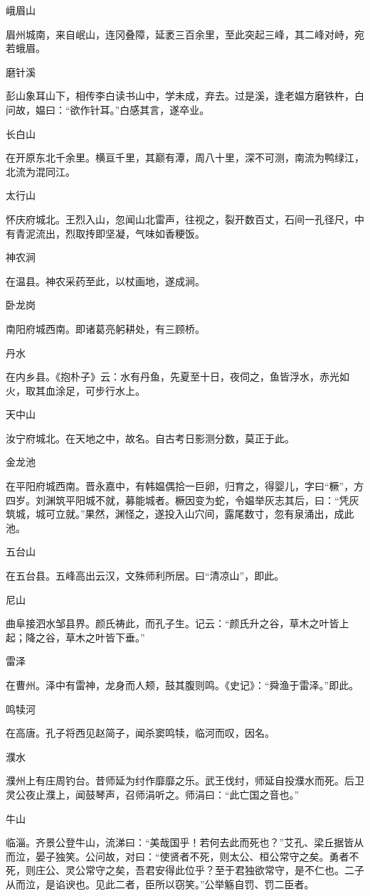 \documentclass[a4paper,12pt,UTF8,twoside]{ctexbook}
\begin{document}
峨眉山

眉州城南，来自岷山，连冈叠障，延袤三百余里，至此突起三峰，其二峰对峙，宛若蛾眉。

磨针溪

彭山象耳山下，相传李白读书山中，学未成，弃去。过是溪，逢老媪方磨铁杵，白问故，媪曰：“欲作针耳。”白感其言，遂卒业。

长白山

在开原东北千余里。横亘千里，其巅有潭，周八十里，深不可测，南流为鸭绿江，北流为混同江。

太行山

怀庆府城北。王烈入山，忽闻山北雷声，往视之，裂开数百丈，石间一孔径尺，中有青泥流出，烈取抟即坚凝，气味如香粳饭。

神农涧

在温县。神农采药至此，以杖画地，遂成涧。

卧龙岗

南阳府城西南。即诸葛亮躬耕处，有三顾桥。

丹水

在内乡县。《抱朴子》云：水有丹鱼，先夏至十日，夜伺之，鱼皆浮水，赤光如火，取其血涂足，可步行水上。

天中山

汝宁府城北。在天地之中，故名。自古考日影测分数，莫正于此。

金龙池

在平阳府城西南。晋永嘉中，有韩媪偶拾一巨卵，归育之，得婴儿，字曰“橛”，方四岁。刘渊筑平阳城不就，募能城者。橛因变为蛇，令媪举灰志其后，曰：“凭灰筑城，城可立就。”果然，渊怪之，遂投入山穴间，露尾数寸，忽有泉涌出，成此池。

五台山

在五台县。五峰高出云汉，文殊师利所居。曰“清凉山”，即此。

尼山

曲阜接泗水邹县界。颜氏祷此，而孔子生。记云：“颜氏升之谷，草木之叶皆上起；降之谷，草木之叶皆下垂。”

雷泽

在曹州。泽中有雷神，龙身而人颊，鼓其腹则鸣。《史记》：“舜渔于雷泽。”即此。

鸣犊河

在高唐。孔子将西见赵简子，闻杀窦鸣犊，临河而叹，因名。

濮水

濮州上有庄周钓台。昔师延为纣作靡靡之乐。武王伐纣，师延自投濮水而死。后卫灵公夜止濮上，闻鼓琴声，召师涓听之。师涓曰：“此亡国之音也。”

牛山

临淄。齐景公登牛山，流涕曰：“美哉国乎！若何去此而死也？”艾孔、梁丘据皆从而泣，晏子独笑。公问故，对曰：“使贤者不死，则太公、桓公常守之矣。勇者不死，则庄公、灵公常守之矣，吾君安得此位乎？至于君独欲常守，是不仁也。二子从而泣，是谄谀也。见此二者，臣所以窃笑。”公举觞自罚、罚二臣者。
\end{document}
